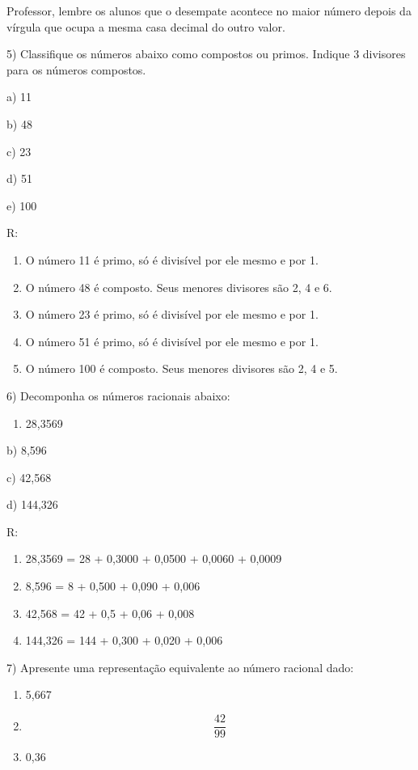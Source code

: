 Professor, lembre os alunos que o desempate acontece no maior número
depois da vírgula que ocupa a mesma casa decimal do outro valor.

5) Classifique os números abaixo como compostos ou primos. Indique 3
divisores para os números compostos.

a) 11

b) 48

c) 23

d) 51

e) 100

R:

\begin{enumerate}
\def\labelenumi{\alph{enumi})}
\item
  O número 11 é primo, só é divisível por ele mesmo e por 1.
\item
  O número 48 é composto. Seus menores divisores são 2, 4 e 6.
\item
  O número 23 é primo, só é divisível por ele mesmo e por 1.
\item
  O número 51 é primo, só é divisível por ele mesmo e por 1.
\item
  O número 100 é composto. Seus menores divisores são 2, 4 e 5.
\end{enumerate}

6) Decomponha os números racionais abaixo:

\begin{enumerate}
\def\labelenumi{\alph{enumi})}
\tightlist
\item
  28,3569
\end{enumerate}

b) 8,596

c) 42,568

d) 144,326

R:

\begin{enumerate}
\def\labelenumi{\alph{enumi})}
\item
  28,3569 = 28 + 0,3000 + 0,0500 + 0,0060 + 0,0009
\item
  8,596 = 8 + 0,500 + 0,090 + 0,006
\item
  42,568 = 42 + 0,5 + 0,06 + 0,008
\item
  144,326 = 144 + 0,300 + 0,020 + 0,006
\end{enumerate}

7) Apresente uma representação equivalente ao número racional dado:

\begin{enumerate}
\def\labelenumi{\alph{enumi})}
\item
  5,667
\item
  \[\frac{42}{99}\]
\item
  0,36
\end{enumerate}

